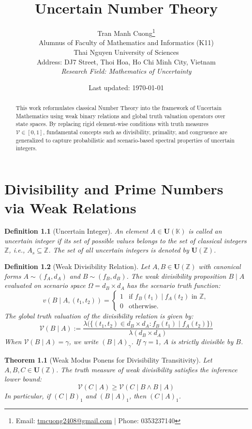 \documentclass[a4paper,14pt, twoside]{memoir}
\title{Uncertain Number Theory}
\author{
	Tran Manh Cuong\thanks{Email: \href{mailto:tmcuong2408@gmail.com}{tmcuong2408@gmail.com} | Phone: 0353237140} \\[0.5em]
	\small Alumnus of Faculty of Mathematics and Informatics (K11)
	\\ Thai Nguyen University of Sciences \\
	\small Address: DJ7 Street, Thoi Hoa, Ho Chi Minh City, Vietnam \\
	\small \textit{Research Field: Mathematics of Uncertainty}
}
\date{Last updated: \today}
\newtheorem{definition}{Definition}[chapter]
\newtheorem{theorem}{Theorem}[chapter]
\newcommand{\tsbd}[1]{\mathbf{U}(\mathbb{#1})}
\newcommand{\ddclmd}{\mathcal{V}} %
\begin{document}
	
	\maketitle
	
	\begin{abstract}
		This work reformulates classical Number Theory into the framework of Uncertain Mathematics using weak binary relations and global truth valuation operators over state spaces. By replacing rigid element-wise conditions with truth measures $\ddclmd \in [0,1]$, fundamental concepts such as divisibility, primality, and congruence are generalized to capture probabilistic and scenario-based spectral properties of uncertain integers.
	\end{abstract}
	
	\chapter{Divisibility and Prime Numbers via Weak Relations}
	
	\begin{definition}[Uncertain Integer]
		An element $A \in \tsbd{K}$ is called an uncertain integer if its set of possible values belongs to the set of classical integers $\mathbb{Z}$, i.e., $A_s \subseteq \mathbb{Z}$. The set of all uncertain integers is denoted by $\tsbd{Z}$.
	\end{definition}
	
	\begin{definition}[Weak Divisibility Relation]
		Let $A, B \in \tsbd{Z}$ with canonical forms $A \sim (f_A, d_A)$ and $B \sim (f_B, d_B)$. The weak divisibility proposition $B \mid A$ evaluated on scenario space $\Omega = d_B \times d_A$ has the scenario truth function:
		\[
		v(B \mid A, (t_1, t_2)) = \begin{cases}
			1 & \text{if } f_B(t_1) \mid f_A(t_2) \text{ in } \mathbb{Z}, \\
			0 & \text{otherwise.}
		\end{cases}
		\]
		The global truth valuation of the divisibility relation is given by:
		\[
		\ddclmd(B \mid A) := \frac{\lambda\big(\{(t_1, t_2) \in d_B \times d_A : f_B(t_1) \mid f_A(t_2)\}\big)}{\lambda(d_B \times d_A)}
		\]
		When $\ddclmd(B \mid A) = \gamma$, we write $(B \mid A)_\gamma$. If $\gamma = 1$, $A$ is strictly divisible by $B$.
	\end{definition}
	
	\begin{theorem}[Weak Modus Ponens for Divisibility Transitivity]
		Let $A, B, C \in \tsbd{Z}$. The truth measure of weak divisibility satisfies the inference lower bound:
		\[
		\ddclmd(C \mid A) \ge \ddclmd(C \mid B \land B \mid A)
		\]
		In particular, if $(C \mid B)_1$ and $(B \mid A)_1$, then $(C \mid A)_1$.
	\end{theorem}
	
\end{document}
